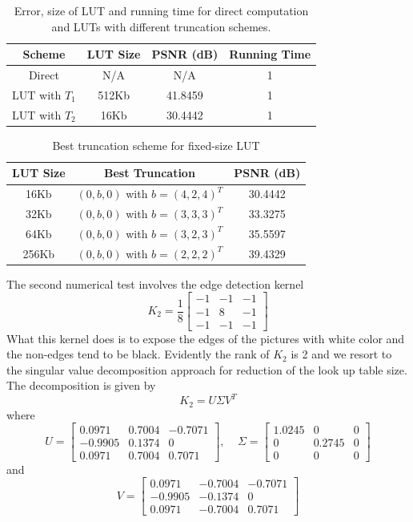 \documentclass[12pt]{amsart}
\theoremstyle{definition}
\theoremstyle{remark}
\numberwithin{thm}{section}
\begin{document}
\begin{center}
\begin{table}
	 \caption{Error, size of LUT and running time for direct computation and LUTs with different truncation schemes.}
    \begin{tabular}{ | c | c| c | c |}
    \hline
    Scheme & LUT Size & PSNR (dB) & Running Time \\ \hline
    Direct & N/A & N/A & 1 \\ \hline
    LUT with $T_1$ & 512Kb & 41.8459 & 1 \\ \hline
    LUT with $T_2$ & 16Kb & 30.4442 & 1 \\ \hline   
    \end{tabular}
\end{table} 
\end{center}

\begin{center}
\begin{table}
	 \caption{Best truncation scheme for fixed-size LUT}
    \begin{tabular}{ | c | c | c | }
    \hline
    LUT Size & Best Truncation & PSNR (dB) \\ \hline
    16Kb& $(0,b,0)$ with $b=(4,2,4)^T$ & 30.4442 \\ \hline
    32Kb& $(0,b,0)$ with $b=(3,3,3)^T$ & 33.3275 \\ \hline 
    64Kb& $(0,b,0)$ with $b=(3,2,3)^T$ & 35.5597 \\ \hline 
    256Kb& $(0,b,0)$ with $b=(2,2,2)^T$ & 39.4329 \\ \hline 
    \end{tabular}
\end{table} 
\end{center}

The second numerical test involves the edge detection kernel 
$$
K_2=\frac{1}{8}
\begin{bmatrix}
-1 & -1 & -1\\
-1 &  8 & -1\\
-1 & -1 & -1
\end{bmatrix}
$$
What this kernel does is to expose the edges of the pictures with white  color and the non-edges tend to be black. Evidently the rank of $K_2$ is 2 and we resort to the singular value decomposition approach for reduction of the look up table size. The decomposition is given by 
$$
K_2=U\Sigma V^T
$$
where
$$
U=
\begin{bmatrix}
 0.0971 & 0.7004 & -0.7071\\
-0.9905 & 0.1374 & 0\\
 0.0971 & 0.7004 & 0.7071
\end{bmatrix}
, \ \ \ \ \ \Sigma=
\begin{bmatrix}
1.0245 & 0 & 0\\
0& 0.2745 & 0\\
0 & 0 & 0
\end{bmatrix}
$$
and
$$
V=
\begin{bmatrix}
 0.0971 & -0.7004 & -0.7071\\
-0.9905 & -0.1374 & 0\\
 0.0971 & -0.7004 & 0.7071
\end{bmatrix}
$$
\end{document}
